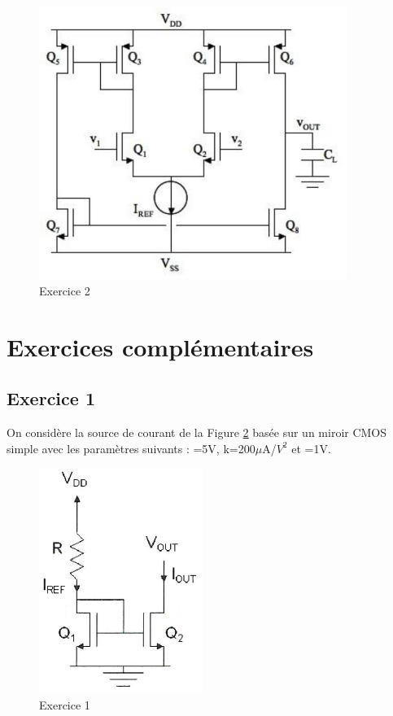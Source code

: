 \documentclass[paper=a4, fontsize=11pt]{article} %
\numberwithin{equation}{section} %
\numberwithin{figure}{section} %
\numberwithin{table}{section} %
\begin{document}
\begin{figure}[!htbp]
   \centering
   \includegraphics[width=10cm]{figure/fig12-1.png}
   \caption{Exercice 2}
   \label{fig12-1}
\end{figure}







\clearpage
\newpage
\setcounter{figure}{0}
\setcounter{section}{12}
\section{Exercices complémentaires}

\subsection*{Exercice 1}
On considère la source de courant de la Figure \ref{fig13-1} basée sur un miroir CMOS simple avec les paramètres suivants : \vdd=5V, k=200$\mu$A/$V^2$ et \vtn=1V.

\begin{figure}[!htbp]
   \centering
   \includegraphics[]{figure/fig13-1.png}
   \caption{Exercice 1}
   \label{fig13-1}
\end{figure}
\end{document}
